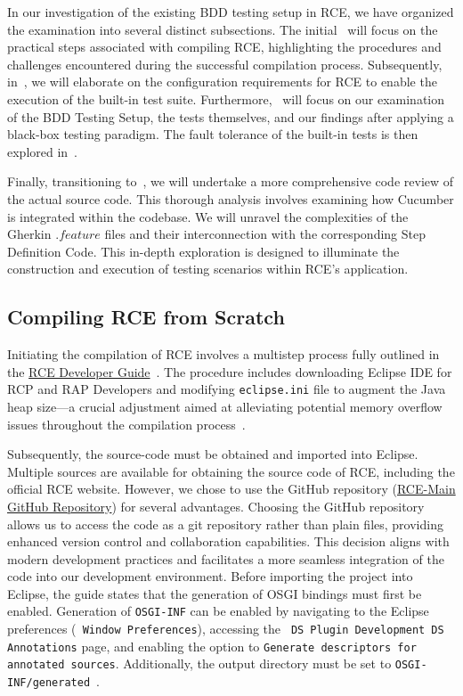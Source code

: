 \label{sec:examination}
In our investigation of the existing BDD testing setup in \ac{RCE}, we have organized the examination into several distinct subsections. The initial~ will focus on the practical steps associated with compiling \ac{RCE}, highlighting the procedures and challenges encountered during the successful compilation process. Subsequently, in~, we will elaborate on the configuration requirements for \ac{RCE} to enable the execution of the built-in test suite. Furthermore,~ will focus on our examination of the BDD Testing Setup, the tests themselves, and our findings after applying a black-box testing paradigm. The fault tolerance of the built-in tests is then explored in~.

Finally, transitioning to~, we will undertake a more comprehensive code review of the actual source code. This thorough analysis involves examining how Cucumber is integrated within the codebase. We will unravel the complexities of the Gherkin $.feature$ files and their interconnection with the corresponding Step Definition Code. This in-depth exploration is designed to illuminate the construction and execution of testing scenarios within \ac{RCE}'s application.

\subsection{Compiling \ac{RCE} from Scratch}
\label{subsec:BuildingRCE}
Initiating the compilation of \ac{RCE} involves a multistep process fully outlined in the \href{https://rcenvironment.de/pages/documentation/documentation.html}{RCE Developer Guide}~\cite{rceDevGuide10x}. The procedure includes downloading Eclipse IDE for RCP and RAP Developers and modifying \texttt{eclipse.ini} file to augment the Java heap size—a crucial adjustment aimed at alleviating potential memory overflow issues throughout the compilation process~\cite{rceDevGuide10x}.

Subsequently, the source-code must be obtained and imported into Eclipse. Multiple sources are available for obtaining the source code of \ac{RCE}, including the official RCE website. However, we chose to use the GitHub repository (\href{https://github.com/rcenvironment/rce-main}{RCE-Main GitHub Repository}) for several advantages. Choosing the GitHub repository allows us to access the code as a git repository rather than plain files, providing enhanced version control and collaboration capabilities. This decision aligns with modern development practices and facilitates a more seamless integration of the code into our development environment. Before importing the project into Eclipse, the guide states that the generation of OSGI bindings must first be enabled. Generation of \texttt{OSGI-INF} can be enabled by navigating to the Eclipse preferences (\texttt{ Window Preferences}), accessing the \texttt{ DS Plugin Development DS Annotations} page, and enabling the option to \texttt{Generate descriptors for annotated sources}. Additionally, the output directory must be set to \texttt{OSGI-INF/generated}~\cite{rceDevGuide10x}.

